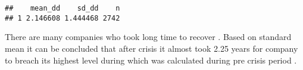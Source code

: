 \documentclass[
]{article}
\begin{document}
\begin{verbatim}
##    mean_dd    sd_dd    n
## 1 2.146608 1.444468 2742
\end{verbatim}

There are many companies who took long time to recover . Based on
standard mean it can be concluded that after crisis it almost took 2.25
years for company to breach its highest level during which was
calculated during pre crisis period .
\end{document}
